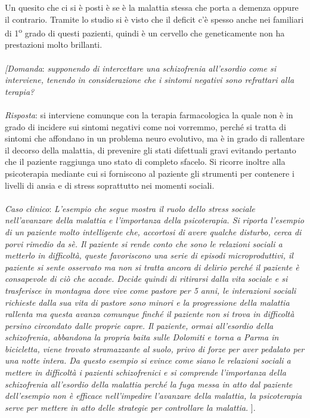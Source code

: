 Un quesito che ci si è posti è se è la malattia stessa che porta a
demenza oppure il contrario. Tramite lo studio si è visto che il deficit
c'è spesso anche nei familiari di 1\textsuperscript{o} grado di questi pazienti, quindi è
un cervello che geneticamente non ha prestazioni molto brillanti.
\\\\
\emph{{[}Domanda}: \emph{supponendo di intercettare una schizofrenia
all'esordio come si interviene, tenendo in considerazione che i sintomi
negativi sono refrattari alla terapia? }
\\\\
\emph{Risposta}: si interviene comunque con la terapia farmacologica la
quale non è in grado di incidere sui sintomi negativi come noi vorremmo,
perché si tratta di sintomi che affondano in un problema neuro
evolutivo, ma è in grado di rallentare il decorso della malattia, di
prevenire gli stati difettuali gravi evitando pertanto che il paziente
raggiunga uno stato di completo sfacelo. Si ricorre inoltre alla
psicoterapia mediante cui si forniscono al paziente gli strumenti per
contenere i livelli di ansia e di stress soprattutto nei momenti
sociali.
\\\\
\emph{Caso clinico}: \emph{L'esempio che segue mostra il ruolo dello
stress sociale nell'avanzare della malattia e l'importanza della
psicoterapia. Si riporta l'esempio di un paziente molto intelligente
che, accortosi di avere qualche disturbo, cerca di porvi rimedio da sè.
Il paziente si rende conto che sono le relazioni sociali a metterlo in
difficoltà, queste favoriscono una serie di episodi microproduttivi, il
paziente si sente osservato ma non si tratta ancora di delirio perché il
paziente è consapevole di ciò che accade. Decide quindi di ritirarsi
dalla vita sociale e si trasferisce in montagna dove vive come pastore
per 5 anni, le interazioni sociali richieste dalla sua vita di pastore
sono minori e la progressione della malattia rallenta ma questa avanza
comunque finché il paziente non si trova in difficoltà persino
circondato dalle proprie capre. Il paziente, ormai all'esordio della
schizofrenia, abbandona la propria baita sulle Dolomiti e torna a Parma
in bicicletta, viene trovato stramazzante al suolo, privo di forze per
aver pedalato per una notte intera. Da questo esempio si evince come
siano le relazioni sociali a mettere in difficoltà i pazienti
schizofrenici e si comprende l'importanza della schizofrenia all'esordio
della malattia perché la fuga messa in atto dal paziente dell'esempio
non è efficace nell'impedire l'avanzare della malattia, la psicoterapia
serve per mettere in atto delle strategie per controllare la malattia.}
{]}.
